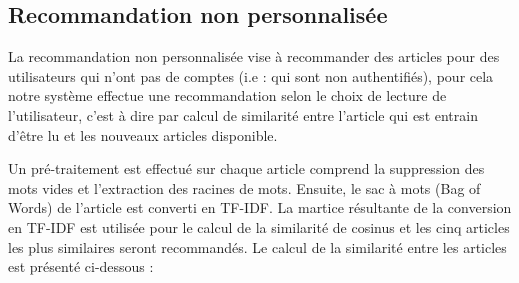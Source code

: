     \subsection{Recommandation non personnalisée}
    La recommandation non personnalisée vise à recommander des articles pour des utilisateurs qui n'ont pas de comptes (i.e : qui sont non authentifiés), pour cela notre système effectue une recommandation selon le choix de lecture de l'utilisateur, c'est à dire par calcul de similarité entre l'article qui est entrain d'être lu et les nouveaux articles disponible. 

    Un pré-traitement est effectué sur chaque article comprend la suppression des mots vides et l'extraction des racines de mots. Ensuite, le sac à mots (Bag of Words) de l'article est converti en TF-IDF. La martice résultante de la conversion en TF-IDF est utilisée pour le calcul de la similarité de cosinus et les cinq articles les plus similaires seront recommandés. Le calcul de la similarité entre les articles est présenté ci-dessous :

